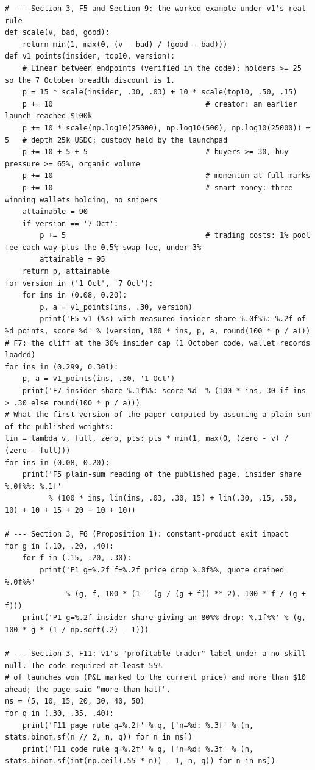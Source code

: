 \begin{verbatim}
# --- Section 3, F5 and Section 9: the worked example under v1's real rule
def scale(v, bad, good):
    return min(1, max(0, (v - bad) / (good - bad)))
def v1_points(insider, top10, version):
    # Linear between endpoints (verified in the code); holders >= 25 so the 7 October breadth discount is 1.
    p = 15 * scale(insider, .30, .03) + 10 * scale(top10, .50, .15)
    p += 10                                   # creator: an earlier launch reached $100k
    p += 10 * scale(np.log10(25000), np.log10(500), np.log10(25000)) + 5   # depth 25k USDC; custody held by the launchpad
    p += 10 + 5 + 5                           # buyers >= 30, buy pressure >= 65%, organic volume
    p += 10                                   # momentum at full marks
    p += 10                                   # smart money: three winning wallets holding, no snipers
    attainable = 90
    if version == '7 Oct':
        p += 5                                # trading costs: 1% pool fee each way plus the 0.5% swap fee, under 3%
        attainable = 95
    return p, attainable
for version in ('1 Oct', '7 Oct'):
    for ins in (0.08, 0.20):
        p, a = v1_points(ins, .30, version)
        print('F5 v1 (%s) with measured insider share %.0f%%: %.2f of %d points, score %d' % (version, 100 * ins, p, a, round(100 * p / a)))
# F7: the cliff at the 30% insider cap (1 October code, wallet records loaded)
for ins in (0.299, 0.301):
    p, a = v1_points(ins, .30, '1 Oct')
    print('F7 insider share %.1f%%: score %d' % (100 * ins, 30 if ins > .30 else round(100 * p / a)))
# What the first version of the paper computed by assuming a plain sum of the published weights:
lin = lambda v, full, zero, pts: pts * min(1, max(0, (zero - v) / (zero - full)))
for ins in (0.08, 0.20):
    print('F5 plain-sum reading of the published page, insider share %.0f%%: %.1f'
          % (100 * ins, lin(ins, .03, .30, 15) + lin(.30, .15, .50, 10) + 10 + 15 + 20 + 10 + 10))

# --- Section 3, F6 (Proposition 1): constant-product exit impact
for g in (.10, .20, .40):
    for f in (.15, .20, .30):
        print('P1 g=%.2f f=%.2f price drop %.0f%%, quote drained %.0f%%'
              % (g, f, 100 * (1 - (g / (g + f)) ** 2), 100 * f / (g + f)))
    print('P1 g=%.2f insider share giving an 80%% drop: %.1f%%' % (g, 100 * g * (1 / np.sqrt(.2) - 1)))

# --- Section 3, F11: v1's "profitable trader" label under a no-skill null. The code required at least 55%
# of launches won (P&L marked to the current price) and more than $10 ahead; the page said "more than half".
ns = (5, 10, 15, 20, 30, 40, 50)
for q in (.30, .35, .40):
    print('F11 page rule q=%.2f' % q, ['n=%d: %.3f' % (n, stats.binom.sf(n // 2, n, q)) for n in ns])
    print('F11 code rule q=%.2f' % q, ['n=%d: %.3f' % (n, stats.binom.sf(int(np.ceil(.55 * n)) - 1, n, q)) for n in ns])


\end{verbatim}
